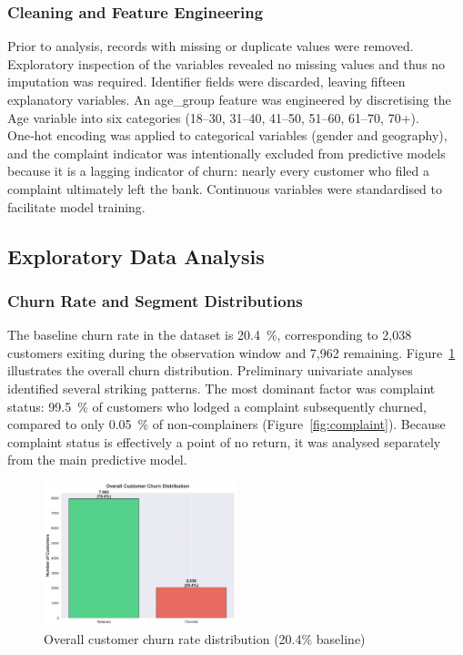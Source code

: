 \documentclass[12pt]{article}
\begin{document}
\subsubsection{Cleaning and Feature Engineering}
Prior to analysis, records with missing or duplicate values were removed.  Exploratory inspection of the variables revealed no missing values and thus no imputation was required.  Identifier fields were discarded, leaving fifteen explanatory variables.  An age\_group feature was engineered by discretising the Age variable into six categories (18–30, 31–40, 41–50, 51–60, 61–70, 70+).  One‑hot encoding was applied to categorical variables (gender and geography), and the complaint indicator was intentionally excluded from predictive models because it is a lagging indicator of churn: nearly every customer who filed a complaint ultimately left the bank.  Continuous variables were standardised to facilitate model training.

\subsection{Exploratory Data Analysis}
\subsubsection{Churn Rate and Segment Distributions}
The baseline churn rate in the dataset is 20.4~\%, corresponding to 2,038 customers exiting during the observation window and 7,962 remaining.  Figure~\ref{fig:churn_rate} illustrates the overall churn distribution.  Preliminary univariate analyses identified several striking patterns.  The most dominant factor was complaint status: 99.5~\% of customers who lodged a complaint subsequently churned, compared to only 0.05~\% of non‑complainers (Figure~\ref{fig:complaint}).  Because complaint status is effectively a point of no return, it was analysed separately from the main predictive model.

\begin{figure}[H]
\centering
\includegraphics[width=0.5\textwidth]{img/01_overall_churn_rate.png}
\caption{Overall customer churn rate distribution (20.4\% baseline)}
\label{fig:churn_rate}
\end{figure}
\end{document}
